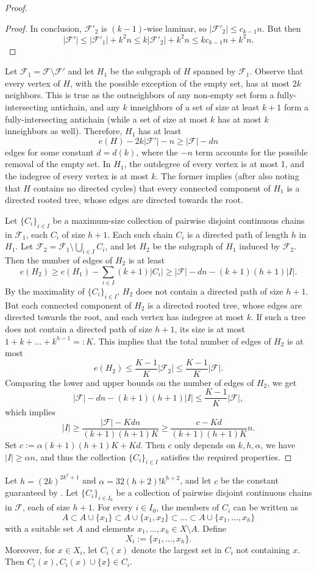 \documentclass[11pt]{article}
\theoremstyle{definition}
\newcommand{\cF}{\mathcal{F}}
\begin{document}
\begin{proof}
\begin{proof}
In conclusion, $\cF'_2$ is $(k-1)$-wise laminar, so $|\cF'_2|\leq c_{k-1}n$. But then $$|\cF'|\leq |\cF'_1|+k^2n\leq k|\cF'_2|+k^2n\leq kc_{k-1}n+k^2n.$$
\end{proof}

Let $\cF_1=\cF\setminus\cF'$ and let $H_1$ be the subgraph of $H$ spanned by $\cF_1$. Observe that every vertex of $H$, with the possible exception of the empty set, has at most $2k$ neighbors. This is true as the outneighbors of any non-empty set form a fully-intersecting antichain, and any $k$ inneighbors of a set of size at least $k+1$ form a fully-intersecting antichain (while a set of size at most $k$ has at most $k$ inneighbors as well). Therefore, $H_1$ has at least 
$$e(H)-2k|\cF'|-n\geq |\cF|-dn$$
edges for some constant $d=d(k)$, where the $-n$ term accounts for the possible removal of the empty set. In $H_1$, the outdegree of every vertex is at most 1, and the indegree of every vertex is at most $k$. The former implies (after also noting that $H$ contains no directed cycles) that every connected component of $H_1$ is a directed rooted tree, whose edges are directed towards the root.

Let $\{C_i\}_{i\in I}$ be a maximum-size collection of pairwise disjoint continuous chains in $\cF_1$, each $C_i$ of size $h+1$. Each such chain $C_i$ is a directed path of length $h$ in $H_1$. Let $\cF_2=\cF_1\setminus\bigcup_{i\in I}C_i$, and let $H_2$ be the subgraph of $H_1$ induced by $\cF_2$. Then the number of edges of $H_2$ is at least 
$$e(H_2)\geq e(H_1)-\sum_{i\in I}(k+1)|C_i|\geq |\cF|-dn-(k+1)(h+1)|I|.$$
 By the maximality of $\{C_i\}_{i\in I}$, $H_2$ does not contain a directed path of size $h+1$. But each connected component of $H_2$ is a directed rooted tree, whose edges are directed towards the root, and each vertex has indegree at most $k$. If such a tree does not contain a directed path of size $h+1$, its size is at most $1+k+\dots+k^{h-1}=:K$. This implies that the total number of edges of $H_2$ is at most 
$$e(H_2)\leq \frac{K-1}{K}|\cF_2|\leq \frac{K-1}{K}|\cF|.$$ Comparing the lower and upper bounds on the number of edges of $H_2$, we get
$$|\cF|-dn-(k+1)(h+1)|I|\leq \frac{K-1}{K}|\cF|,$$
which implies
$$|I|\geq \frac{|\cF|-Kdn}{(k+1)(h+1)K}\geq \frac{c-Kd}{(k+1)(h+1)K}n.$$
Set $c:=\alpha(k+1)(h+1)K+Kd$. Then $c$ only depends on $k,h,\alpha$, we have $|I|\geq \alpha n$, and thus the collection $\{C_i\}_{i\in I}$ satisfies the required properties.
\end{proof}

Let $h=(2k)^{2k^2+1}$ and $\alpha=32(h+2)!k^{h+2}$, and let $c$ be the constant guaranteed by . Let $\{C_i\}_{i\in  I_0}$ be a collection of pairwise disjoint continuous chains in $\cF$, each of size $h+1$. For every $i\in I_0$, the members of $C_i$ can be written as 
$$A\subset A\cup\{x_1\}\subset A\cup\{x_1,x_2\}\subset\dots\subset A\cup\{x_1,\dots,x_h\}$$ with a suitable set $A$ and elements $x_1,\dots,x_h\in X\setminus A$. Define 
$$X_i:=\{x_1,\dots,x_h\}.$$ Moreover, for $x\in X_i$, let $C_i(x)$ denote the largest set in $C_i$ not containing $x$. Then $C_i(x),C_i(x)\cup\{x\}\in C_i$.
\end{document}
